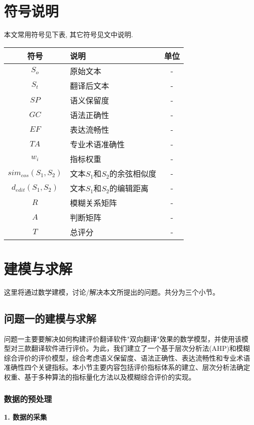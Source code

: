 \documentclass[bwprint]{cumcmthesis}
\begin{document}
\section{符号说明}
本文常用符号见下表, 其它符号见文中说明.
\begin{table}[H]
\centering
\begin{tabularx}{\textwidth}{CLC}
\toprule
符号    & 说明    & 单位 \\
\midrule
$S_o$   & 原始文本 & - \\
$S_t$   & 翻译后文本 & - \\
$SP$    & 语义保留度 & - \\
$GC$    & 语法正确性 & - \\
$EF$    & 表达流畅性 & - \\
$TA$    & 专业术语准确性 & - \\
$w_i$   & 指标权重 & - \\
$sim_{cos}(S_1,S_2)$ & 文本$S_1$和$S_2$的余弦相似度 & - \\
$d_{edit}(S_1,S_2)$ & 文本$S_1$和$S_2$的编辑距离 & - \\
$R$ & 模糊关系矩阵 & - \\
$A$ & 判断矩阵 & - \\
$T$ & 总评分 & - \\
\bottomrule
\end{tabularx}
\label{tab:符号说明}
\end{table}


\section{建模与求解}
这里将通过数学建模，讨论/解决本文所提出的问题。共分为三个小节。

\subsection{问题一的建模与求解}
问题一主要要解决如何构建评价翻译软件"双向翻译"效果的数学模型，并使用该模型对三款翻译软件进行评价。为此，我们建立了一个基于层次分析法(AHP)和模糊综合评价的评价模型，综合考虑语义保留度、语法正确性、表达流畅性和专业术语准确性四个关键指标。本小节主要内容包括评价指标体系的建立、层次分析法确定权重、基于多种算法的指标量化方法以及模糊综合评价的实现。

\subsubsection{数据的预处理}
\textbf{1. 数据的采集}
    
\end{document}
